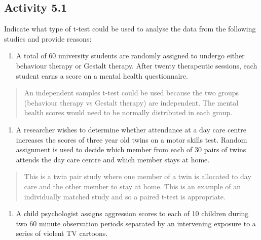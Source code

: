 \documentclass[
]{memoir}
\providecommand{\tightlist}{%
  \setlength{\itemsep}{0pt}\setlength{\parskip}{0pt}}
\begin{document}
\hypertarget{activity-5.1}{%
\subsection*{Activity 5.1}\label{activity-5.1}}

Indicate what type of t-test could be used to analyse the data from the following studies and provide reasons:

\begin{enumerate}
\def\labelenumi{\alph{enumi})}
\tightlist
\item
  A total of 60 university students are randomly assigned to undergo either behaviour therapy or Gestalt therapy. After twenty therapeutic sessions, each student earns a score on a mental health questionnaire.
\end{enumerate}

\begin{quote}
An independent samples t-test could be used because the two groups (behaviour therapy vs Gestalt therapy) are independent. The mental health scores would need to be normally distributed in each group.
\end{quote}

\begin{enumerate}
\def\labelenumi{\alph{enumi})}
\setcounter{enumi}{1}
\tightlist
\item
  A researcher wishes to determine whether attendance at a day care centre increases the scores of three year old twins on a motor skills test. Random assignment is used to decide which member from each of 30 pairs of twins attends the day care centre and which member stays at home.
\end{enumerate}

\begin{quote}
This is a twin pair study where one member of a twin is allocated to day care and the other member to stay at home. This is an example of an individually matched study and so a paired t-test is appropriate.
\end{quote}

\begin{enumerate}
\def\labelenumi{\alph{enumi})}
\setcounter{enumi}{2}
\tightlist
\item
  A child psychologist assigns aggression scores to each of 10 children during two 60 minute observation periods separated by an intervening exposure to a series of violent TV cartoons.
\end{enumerate}
\end{document}
